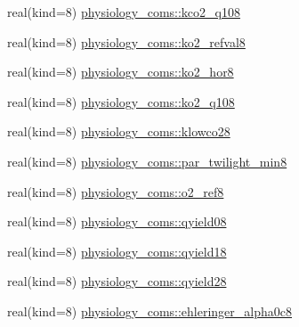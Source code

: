\begin{DoxyCompactItemize}
\item 
real(kind=8) \hyperlink{namespacephysiology__coms_a23fd1186e97b29a505ccd16242869515}{physiology\+\_\+coms\+::kco2\+\_\+q108}
\item 
real(kind=8) \hyperlink{namespacephysiology__coms_ad58b3f543afd8c67c4166bf4475103de}{physiology\+\_\+coms\+::ko2\+\_\+refval8}
\item 
real(kind=8) \hyperlink{namespacephysiology__coms_adc6797a0fabd4a5c58f32153b03c1840}{physiology\+\_\+coms\+::ko2\+\_\+hor8}
\item 
real(kind=8) \hyperlink{namespacephysiology__coms_ae76b821edd73bb3355c6bbf4b22788c3}{physiology\+\_\+coms\+::ko2\+\_\+q108}
\item 
real(kind=8) \hyperlink{namespacephysiology__coms_a7ff06f574deb37ab9eff43f9be9da49d}{physiology\+\_\+coms\+::klowco28}
\item 
real(kind=8) \hyperlink{namespacephysiology__coms_aa75eca5a501c6a496939ae3d5c2eb1eb}{physiology\+\_\+coms\+::par\+\_\+twilight\+\_\+min8}
\item 
real(kind=8) \hyperlink{namespacephysiology__coms_a9f53be8313be66d3616cf393d3efc2de}{physiology\+\_\+coms\+::o2\+\_\+ref8}
\item 
real(kind=8) \hyperlink{namespacephysiology__coms_afb47d1e2c5bcf37ef401c8a6f3fd1bdf}{physiology\+\_\+coms\+::qyield08}
\item 
real(kind=8) \hyperlink{namespacephysiology__coms_ae8f2c4b5c0c426c0cda6a7fcfaed4fe2}{physiology\+\_\+coms\+::qyield18}
\item 
real(kind=8) \hyperlink{namespacephysiology__coms_ade005515e6099db96931eefbd5b36657}{physiology\+\_\+coms\+::qyield28}
\item 
real(kind=8) \hyperlink{namespacephysiology__coms_ac1a3c756943ad554e5a63c0f4ed23b07}{physiology\+\_\+coms\+::ehleringer\+\_\+alpha0c8}
\end{DoxyCompactItemize}
